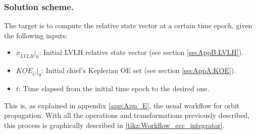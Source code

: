 		\subsubsection{Solution scheme.}
		\indent The target is to compute the relative state vector at a certain time epoch, given the following inputs:
		\begin{itemize}
		\item $\underline{x}_{LVLH}\rvert_{0}$: Initial LVLH relative state vector (see section \ref{secAppB:LVLH}).
		\item $\underline{KOE}_C\rvert_{0}$: Initial chief's Keplerian OE set (see section \ref{secAppA:KOE}).
		\item $t$: Time elapsed from the initial time epoch to the desired one.
		\end{itemize}
		\indent This is, as explained in appendix \ref{app:App_E}, the usual workflow for orbit propagation. With all the operations and transformations previously described, this process is graphically described in \ref{tikz:Workflow_ecc_integrator}.
		
